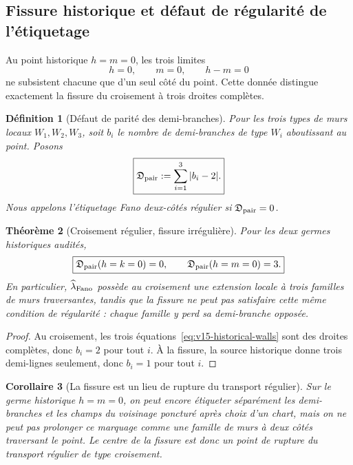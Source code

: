 \documentclass[11pt,a4paper]{article}
\newtheorem{theorem}{Théorème}[section]
\newtheorem{corollary}[theorem]{Corollaire}
\newtheorem{definition}[theorem]{Définition}
\begin{document}
\subsection{Fissure historique et défaut de régularité de l'étiquetage}

Au point historique $h=m=0$, les trois limites
\begin{equation}\label{eq:v15-fissure-walls}
 h=0,
 \qquad
 m=0,
 \qquad
 h-m=0
\end{equation}
ne subsistent chacune que d'un seul côté du point. Cette donnée distingue exactement la fissure du croisement à trois droites complètes.

\begin{definition}[Défaut de parité des demi-branches]\label{def:v15-pairing-defect}
Pour les trois types de murs locaux $W_1,W_2,W_3$, soit $b_i$ le nombre de demi-branches de type $W_i$ aboutissant au point. Posons
\begin{equation}\label{eq:v15-pairing-defect}
 \boxed{
 \mathfrak D_{\rm pair}
 :=\sum_{i=1}^{3}|b_i-2|.}
\end{equation}
Nous appelons l'étiquetage Fano \emph{deux-côtés régulier} si $\mathfrak D_{\rm pair}=0$.
\end{definition}

\begin{theorem}[Croisement régulier, fissure irrégulière]\label{thm:v15-cross-fissure-regularity}
Pour les deux germes historiques audités,
\begin{equation}\label{eq:v15-pairing-values}
 \boxed{
 \mathfrak D_{\rm pair}(h=k=0)=0,
 \qquad
 \mathfrak D_{\rm pair}(h=m=0)=3.}
\end{equation}
En particulier, $\widehat\lambda_{\rm Fano}$ possède au croisement une extension locale à trois familles de murs traversantes, tandis que la fissure ne peut pas satisfaire cette même condition de régularité : chaque famille y perd sa demi-branche opposée.
\end{theorem}

\begin{proof}
Au croisement, les trois équations~\eqref{eq:v15-historical-walls} sont des droites complètes, donc $b_i=2$ pour tout $i$. À la fissure, la source historique donne trois demi-lignes seulement, donc $b_i=1$ pour tout $i$.
\end{proof}

\begin{corollary}[La fissure est un lieu de rupture du transport régulier]\label{cor:v15-fissure-break}
Sur le germe historique $h=m=0$, on peut encore étiqueter séparément les demi-branches et les champs du voisinage poncturé après choix d'un chart, mais on ne peut pas prolonger ce marquage comme une famille de murs à deux côtés traversant le point. Le centre de la fissure est donc un point de rupture du transport régulier de type croisement.
\end{corollary}
\end{document}
